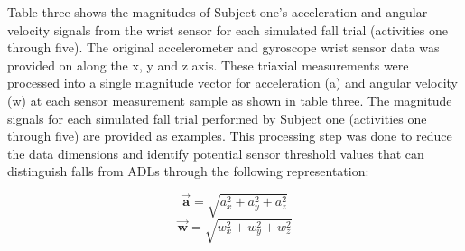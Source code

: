 \documentclass{llncs}
\begin{document}
	Table three shows the magnitudes of Subject one's acceleration and angular velocity signals from the wrist sensor for each simulated fall trial (activities one through five). The original accelerometer and gyroscope wrist sensor data was provided on along the x, y and z axis. These triaxial measurements were processed into a single magnitude vector for acceleration (a) and angular velocity (w) at each sensor measurement sample as shown in table three. The magnitude signals for each simulated fall trial performed by Subject one (activities one through five) are provided as examples. This processing step was done to reduce the data dimensions and identify potential sensor threshold values that can distinguish falls from ADLs through the following representation:
	
\begin{equation*}
    	\vec{\mathbf{a}} = \sqrt{a_{x}^2 + a_{y}^2 + a_{z}^2}
\end{equation*} 
\begin{equation*}
	\vec{\mathbf{w}} = \sqrt{w_{x}^2 + w_{y}^2 + w_{z}^2}
\end{equation*} 
	
\end{document}
